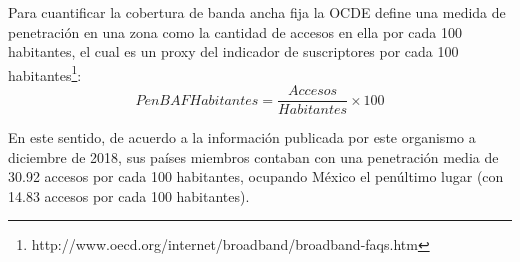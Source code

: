 \documentclass[9pt,twocolumn,twoside]{ilcss}
\begin{document}
%	
%
%

Para cuantificar la cobertura de banda ancha fija la OCDE define una medida de penetración en una zona como la cantidad de accesos en ella por cada 100 habitantes, el cual es un proxy del indicador de suscriptores por cada 100 habitantes\footnote{http://www.oecd.org/internet/broadband/broadband-faqs.htm}:
\begin{equation}\label{pen_habitantes}
PenBAFHabitantes = \frac{Accesos }{Habitantes} \times 100 
\end{equation}

En este sentido, de acuerdo a la información publicada por este organismo a diciembre de 2018, sus países miembros contaban con una penetración media de 30.92 accesos por cada 100 habitantes, ocupando México el penúltimo lugar (con 14.83 accesos por cada 100 habitantes).
\end{document}
